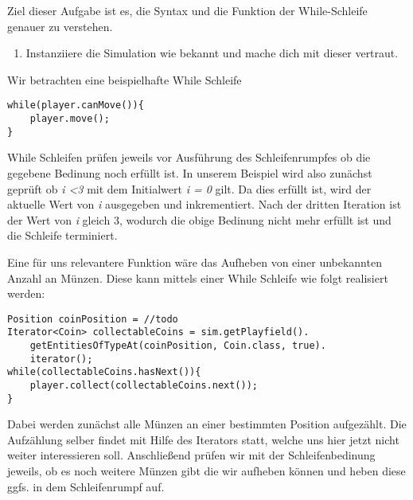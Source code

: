 
Ziel dieser Aufgabe ist es, die Syntax und die Funktion der While-Schleife genauer zu verstehen.
\begin{enumerate}[label=\alph*)]
    \item Instanziiere die Simulation wie bekannt und mache dich mit dieser vertraut.
\end{enumerate}

\begin{Infobox}
    Wir betrachten eine beispielhafte While Schleife
    \begin{lstlisting}[breaklines=true, numbers=none]
while(player.canMove()){
    player.move();
}
    \end{lstlisting}
    While Schleifen prüfen jeweils vor Ausführung des Schleifenrumpfes ob die gegebene Bedinung noch erfüllt ist. In unserem Beispiel 
    wird also zunächst geprüft ob \textit{i \textless 3} mit dem Initialwert \textit{i = 0} gilt. Da dies erfüllt ist, wird der aktuelle Wert von \textit{i}
    ausgegeben und inkrementiert. Nach der dritten Iteration ist der Wert von \textit{i} gleich 3, wodurch die obige Bedinung nicht mehr erfüllt ist
    und die Schleife terminiert.\par 
    Eine für uns relevantere Funktion wäre das Aufheben von einer unbekannten Anzahl an Münzen. Diese kann mittels einer While Schleife wie folgt 
    realisiert werden:
    \begin{lstlisting}[breaklines=true, numbers=none]
Position coinPosition = //todo
Iterator<Coin> collectableCoins = sim.getPlayfield().
    getEntitiesOfTypeAt(coinPosition, Coin.class, true).
    iterator();
while(collectableCoins.hasNext()){
    player.collect(collectableCoins.next());
}
    \end{lstlisting}
    Dabei werden zunächst alle Münzen an einer bestimmten Position aufgezählt. Die Aufzählung selber findet mit Hilfe 
    des Iterators statt, welche uns hier jetzt nicht weiter interessieren soll. Anschließend prüfen wir mit der Schleifenbedinung
    jeweils, ob es noch weitere Münzen gibt die wir aufheben können und heben diese ggfs. in dem Schleifenrumpf auf.
\end{Infobox}

